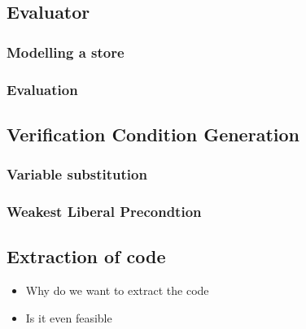 \subsection{Evaluator}


\subsubsection{Modelling a store}


\subsubsection{Evaluation}


\subsection{Verification Condition Generation}


\subsubsection{Variable substitution}


\subsubsection{Weakest Liberal Precondtion}


\subsection{Extraction of code}
\begin{itemize}
\item Why do we want to extract the code
  \item Is it even feasible
\end{itemize}